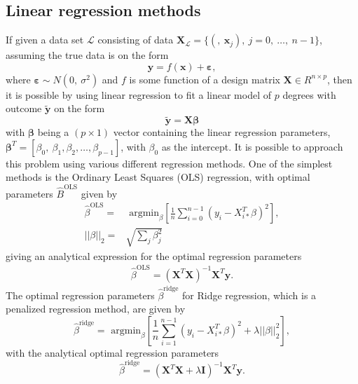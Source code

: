 \documentclass[a4paper, 10pt]{article}
\begin{document}
\begin{multicols}{2}
\subsection{Linear regression methods}
If given a data set $\mathcal{L}$ consisting of data $\bm{X}_\mathcal{L} = \{(	,\ \bm{x}_j),\ j=0,\ \dots,\ n-1\}$, assuming the true data is on the form
\begin{equation}
\bm{y} = f(\bm{x})+ \bm{\varepsilon} ,
\end{equation}
where $\bm{\varepsilon} \sim N(0,\ \sigma ^2)$ and $f$ is some function of a design matrix $\bm{X}\in R^{n\times p}$, then it is possible by using linear regression to fit a linear model of $p$ degrees with outcome $\bm{\tilde{y}}$ on the form
\begin{equation}
\bm{\tilde{y}} = \bm{X}\bm{\beta}
\end{equation}
with $\bm{\beta}$ being a $(p\times 1)$ vector containing the linear regression parameters, $\bm{\beta}^T=[\beta_0,\ \beta_1, \beta_2,\dots,\beta_{p-1}]$, with $\beta_0$ as the intercept.
It is possible to approach this problem using various different regression methods. One of the simplest methods is the Ordinary Least Squares (OLS) regression, with optimal  parameters $\hat{B}^\text{OLS}$ given by
\begin{align}
    \hat{\beta}^\text{OLS} =& \text{ argmin}_{ {\beta} } \left[ \frac{1}{n} \sum_{i=0}^{n-1} (y_i - X_{i*}^T \beta)^2 \right],
    \label{eq:argminbeta_OLS}   \\
        ||\beta||_2 =&  \sqrt{\sum_j \beta_j^2}
\end{align}
giving an analytical expression for the optimal regression parameters
\begin{align}
    \hat{\beta}^{\text{OLS}} = (\bm{X}^T\bm{X})^{-1} \bm{X}^T \bm{y}.
    \label{eq:beta_OLS}
\end{align}
The optimal regression parameters $\hat{\beta}^\text{ridge}$ for Ridge regression, which is a penalized regression method, are given by
\begin{equation}
    \hat{\beta}^\text{ridge} = \text{ argmin}_\beta \left[ \frac{1}{n}\sum_{i=1}^{n-1}(y_i-X_{i*}^T\beta)^2 + \lambda ||\beta||_2^2  \right],
    \label{eq:argminbeta_ridge}
\end{equation}
with the analytical optimal regression parameters
\begin{equation}
    \hat{\beta}^\text{ridge} = (\bm{X}^T\bm{X} +\lambda \bm{I})^{-1} \bm{X}^T \bm{y}.
    \label{eq:beta_ridge}
\end{equation}

\end{multicols}
\end{document}
